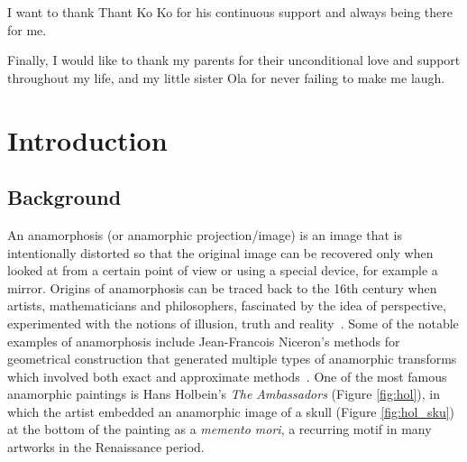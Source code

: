 \documentclass[11pt, oneside, reqno]{book}
\def\shadowshift{4pt,-4pt}
\def\shadowradius{6pt}
\newcommand\drawshadow[1]{
	\begin{pgfonlayer}{shadow}
		\shade[outercolor,inner color=innercolor,outer color=outercolor] ($(#1.south west)+(\shadowshift)+(\shadowradius/2,\shadowradius/2)$) circle (\shadowradius);
		\shade[outercolor,inner color=innercolor,outer color=outercolor] ($(#1.north west)+(\shadowshift)+(\shadowradius/2,-\shadowradius/2)$) circle (\shadowradius);
		\shade[outercolor,inner color=innercolor,outer color=outercolor] ($(#1.south east)+(\shadowshift)+(-\shadowradius/2,\shadowradius/2)$) circle (\shadowradius);
		\shade[outercolor,inner color=innercolor,outer color=outercolor] ($(#1.north east)+(\shadowshift)+(-\shadowradius/2,-\shadowradius/2)$) circle (\shadowradius);
		\shade[top color=innercolor,bottom color=outercolor] ($(#1.south west)+(\shadowshift)+(\shadowradius/2,-\shadowradius/2)$) rectangle ($(#1.south east)+(\shadowshift)+(-\shadowradius/2,\shadowradius/2)$);
		\shade[left color=innercolor,right color=outercolor] ($(#1.south east)+(\shadowshift)+(-\shadowradius/2,\shadowradius/2)$) rectangle ($(#1.north east)+(\shadowshift)+(\shadowradius/2,-\shadowradius/2)$);
		\shade[bottom color=innercolor,top color=outercolor] ($(#1.north west)+(\shadowshift)+(\shadowradius/2,-\shadowradius/2)$) rectangle ($(#1.north east)+(\shadowshift)+(-\shadowradius/2,\shadowradius/2)$);
		\shade[outercolor,right color=innercolor,left color=outercolor] ($(#1.south west)+(\shadowshift)+(-\shadowradius/2,\shadowradius/2)$) rectangle ($(#1.north west)+(\shadowshift)+(\shadowradius/2,-\shadowradius/2)$);
		\filldraw ($(#1.south west)+(\shadowshift)+(\shadowradius/2,\shadowradius/2)$) rectangle ($(#1.north east)+(\shadowshift)-(\shadowradius/2,\shadowradius/2)$);
	\end{pgfonlayer}
}
\newlength\mylen
\newcommand\shadowimage[2][]{%
	\setbox0=\hbox{\texttt{[image: \#2]}}
	\setlength\mylen{\wd0}
	\ifnum\mylen<\ht0
	\setlength\mylen{\ht0}
	\fi
	\divide \mylen by 120
	\def\shadowshift{\mylen,-\mylen}
	\def\shadowradius{\the\dimexpr\mylen+\mylen+\mylen\relax}
	\begin{tikzpicture}
	\node[anchor=south west,inner sep=0] (image) at (0,0) {\texttt{[image: \#2]}};
	\drawshadow{image}
	\end{tikzpicture}
}
\begin{document}
I want to thank Thant Ko Ko for his continuous support and always being there for me.

Finally, I would like to thank my parents for their unconditional love and support throughout my life, and my little sister Ola for never failing to make me laugh.


\doublespace






\chapter{Introduction}
\label{chap:int}


\section{Background}
\label{sec:bac}

An anamorphosis (or anamorphic projection/image) is an image that is intentionally distorted so that the original image can be recovered only when looked at from a certain point of view or using a special device, for example a mirror. Origins of anamorphosis can be traced back to the 16th century when artists, mathematicians and philosophers, fascinated by the idea of perspective, experimented with the notions of illusion, truth and reality~\cite{hunt2000anamorphic}. Some of the notable examples of anamorphosis include Jean-Francois Niceron's methods for geometrical construction that generated multiple types of anamorphic transforms which involved both exact and approximate methods~\cites{hunt2000anamorphic,niceron1992perspective}. One of the most famous anamorphic paintings is Hans Holbein's \textit{The Ambassadors} (Figure \ref{fig:hol}), in which the artist embedded an anamorphic image of a skull (Figure \ref{fig:hol_sku}) at the bottom of the painting as a \textit{memento mori}, a recurring motif in many artworks in the Renaissance period.

\end{document}
